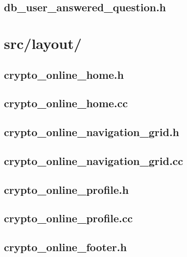 \subsection{db_user_answered_question.h}

\newpage

\section{src/layout/}

\subsection{crypto_online_home.h}

\newpage

\subsection{crypto_online_home.cc}

\newpage

\subsection{crypto_online_navigation_grid.h}

\newpage

\subsection{crypto_online_navigation_grid.cc}

\newpage

\subsection{crypto_online_profile.h}

\newpage

\subsection{crypto_online_profile.cc}

\newpage

\subsection{crypto_online_footer.h}

\newpage

